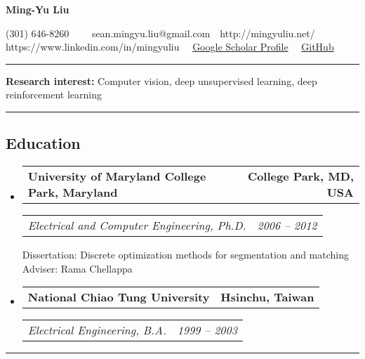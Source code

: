 \documentclass[10pt,letterpaper]{article}
\makeatletter
\newcommand{\headerrow}[2]
{\begin{tabular*}{\linewidth}{l@{\extracolsep{\fill}}r}
	#1 &
	#2 \\
\end{tabular*}}
\makeatother
\begin{document}
\begin{center}
{\LARGE \textbf{Ming-Yu Liu}}

(301) 646-8260\ \ \textbullet
\ \ sean.mingyu.liu@gmail.com\ \ \textbullet http://mingyuliu.net/
\\
https://www.linkedin.com/in/mingyuliu\ \ \textbullet 
\href{https://scholar.google.com/citations?hl=en&user=y-f-MZgAAAAJ&cstart=20&pagesize=20}{Google Scholar Profile}\ \ \textbullet 
\href{https://github.com/mingyuliutw}{GitHub}
\ \ 
\end{center}

\hrule
\vspace{0.2em}
$\quad$\\
{\bf Research interest:} Computer vision, deep unsupervised learning, deep reinforcement learning\\


\hrule
\vspace{-0.4em}
\subsection*{Education}
\begin{itemize}
	\parskip=0.1em
	\item
	\headerrow
		{\textbf{University of Maryland College Park, Maryland}}
		{\textbf{College Park, MD, USA}}
	\headerrow
		{\emph{Electrical and Computer Engineering, Ph.D.}}
		{\emph{2006 -- 2012}}
		Dissertation: Discrete optimization methods for segmentation and matching\\
		Adviser: Rama Chellappa
	\item
	\headerrow
		{\textbf{National Chiao Tung University}}
		{\textbf{Hsinchu, Taiwan}}
	\headerrow
		{\emph{Electrical Engineering, B.A.}}
		{\emph{1999 -- 2003}}
\end{itemize}
\hrule
\vspace{-0.4em}
\end{document}

